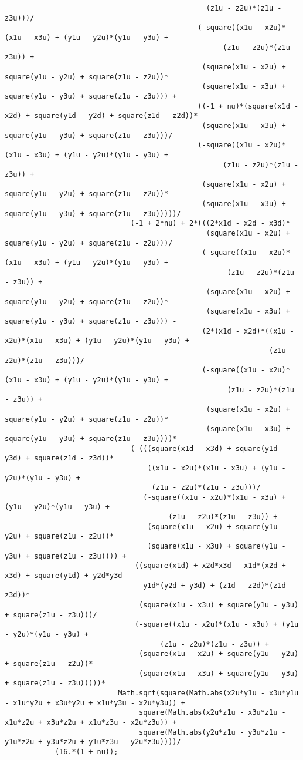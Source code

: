 \begin{lstlisting}
												(z1u - z2u)*(z1u - z3u)))/
											  (-square((x1u - x2u)*(x1u - x3u) + (y1u - y2u)*(y1u - y3u) + 
													(z1u - z2u)*(z1u - z3u)) + 
											   (square(x1u - x2u) + square(y1u - y2u) + square(z1u - z2u))*
											   (square(x1u - x3u) + square(y1u - y3u) + square(z1u - z3u))) + 
											  ((-1 + nu)*(square(x1d - x2d) + square(y1d - y2d) + square(z1d - z2d))*
											   (square(x1u - x3u) + square(y1u - y3u) + square(z1u - z3u)))/
											  (-square((x1u - x2u)*(x1u - x3u) + (y1u - y2u)*(y1u - y3u) + 
													(z1u - z2u)*(z1u - z3u)) + 
											   (square(x1u - x2u) + square(y1u - y2u) + square(z1u - z2u))*
											   (square(x1u - x3u) + square(y1u - y3u) + square(z1u - z3u)))))/
							  (-1 + 2*nu) + 2*(((2*x1d - x2d - x3d)*
												(square(x1u - x2u) + square(y1u - y2u) + square(z1u - z2u)))/
											   (-square((x1u - x2u)*(x1u - x3u) + (y1u - y2u)*(y1u - y3u) + 
													 (z1u - z2u)*(z1u - z3u)) + 
												(square(x1u - x2u) + square(y1u - y2u) + square(z1u - z2u))*
												(square(x1u - x3u) + square(y1u - y3u) + square(z1u - z3u))) - 
											   (2*(x1d - x2d)*((x1u - x2u)*(x1u - x3u) + (y1u - y2u)*(y1u - y3u) + 
															   (z1u - z2u)*(z1u - z3u)))/
											   (-square((x1u - x2u)*(x1u - x3u) + (y1u - y2u)*(y1u - y3u) + 
													 (z1u - z2u)*(z1u - z3u)) + 
												(square(x1u - x2u) + square(y1u - y2u) + square(z1u - z2u))*
												(square(x1u - x3u) + square(y1u - y3u) + square(z1u - z3u))))*
							  (-(((square(x1d - x3d) + square(y1d - y3d) + square(z1d - z3d))*
								  ((x1u - x2u)*(x1u - x3u) + (y1u - y2u)*(y1u - y3u) + 
								   (z1u - z2u)*(z1u - z3u)))/
								 (-square((x1u - x2u)*(x1u - x3u) + (y1u - y2u)*(y1u - y3u) + 
									   (z1u - z2u)*(z1u - z3u)) + 
								  (square(x1u - x2u) + square(y1u - y2u) + square(z1u - z2u))*
								  (square(x1u - x3u) + square(y1u - y3u) + square(z1u - z3u)))) + 
							   ((square(x1d) + x2d*x3d - x1d*(x2d + x3d) + square(y1d) + y2d*y3d - 
								 y1d*(y2d + y3d) + (z1d - z2d)*(z1d - z3d))*
								(square(x1u - x3u) + square(y1u - y3u) + square(z1u - z3u)))/
							   (-square((x1u - x2u)*(x1u - x3u) + (y1u - y2u)*(y1u - y3u) + 
									 (z1u - z2u)*(z1u - z3u)) + 
								(square(x1u - x2u) + square(y1u - y2u) + square(z1u - z2u))*
								(square(x1u - x3u) + square(y1u - y3u) + square(z1u - z3u)))))*
						   Math.sqrt(square(Math.abs(x2u*y1u - x3u*y1u - x1u*y2u + x3u*y2u + x1u*y3u - x2u*y3u)) + 
								square(Math.abs(x2u*z1u - x3u*z1u - x1u*z2u + x3u*z2u + x1u*z3u - x2u*z3u)) + 
								square(Math.abs(y2u*z1u - y3u*z1u - y1u*z2u + y3u*z2u + y1u*z3u - y2u*z3u))))/
			(16.*(1 + nu));
			

\end{lstlisting}
